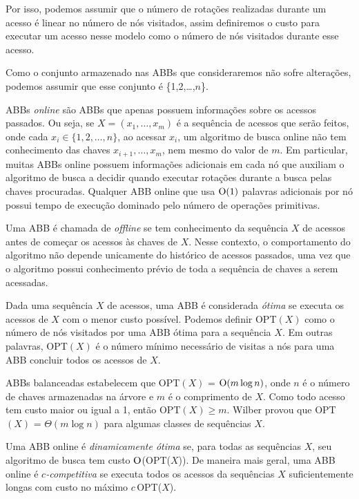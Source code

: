 Por isso, podemos assumir que o número de rotações realizadas durante um acesso é linear no número de nós visitados, assim definiremos o custo para executar um acesso nesse modelo como o número de nós visitados durante esse acesso.

Como o conjunto armazenado nas ABBs que consideraremos não sofre alterações, podemos assumir que esse conjunto é \{1,2,\ldots,$n$\}.

ABBs \textit{online} são ABBs que apenas possuem informações sobre os acessos passados. Ou seja, se $X = (x_1, \ldots, x_m)$ é a sequência de acessos que serão feitos, onde cada $x_i \in \{1,2,\ldots,n\}$, ao acessar $x_{i}$, um algoritmo de busca online não tem conhecimento das chaves $x_{i+1},\ldots,x_{m}$, nem mesmo do valor de $m$. Em particular, muitas ABBs online possuem informações adicionais em cada nó que auxiliam o algoritmo de busca a decidir quando executar rotações durante a busca pelas chaves procuradas. Qualquer ABB online que usa $\mathrm{O}(1)$ palavras adicionais por nó possui tempo de execução dominado pelo número de operações primitivas.

Uma ABB é chamada de \textit{offline} se tem conhecimento da sequência $X$ de acessos antes de começar os acessos às chaves de $X$. Nesse contexto, o comportamento do algoritmo não depende unicamente do histórico de acessos passados, uma vez que o algoritmo possui conhecimento prévio de toda a sequência de chaves a serem acessadas.

Dada uma sequência $X$ de acessos, uma ABB é considerada \textit{ótima} se executa os acessos de $X$ com o menor custo possível. Podemos definir OPT$(X)$ como o número de nós visitados por uma ABB ótima para a sequência $X$. Em outras palavras, OPT$(X)$ é o número mínimo necessário de visitas a nós para uma ABB concluir todos os acessos de $X$. 

ABBs balanceadas estabelecem que OPT$(X)$ = $\mathrm{O}(m \log n)$, onde $n$ é o número de chaves armazenadas na árvore e $m$ é o comprimento de $X$. Como todo acesso tem custo maior ou igual a 1, então $\text{OPT}(X) \geq m$. Wilber \cite{lowerbound_wilber} provou que OPT$(X)$ = $\Theta$$(m \log n)$ para algumas classes de sequências $X$. 

Uma ABB online é \textit{dinamicamente ótima} se, para todas as sequências $X$, seu algoritmo de busca tem custo $\mathrm{O}$(OPT($X$)). De maneira mais geral, uma ABB online é \textit{$c$-competitiva} se executa todos os acessos da sequências $X$ suficientemente longas com custo no máximo $c$\,OPT($X$).

